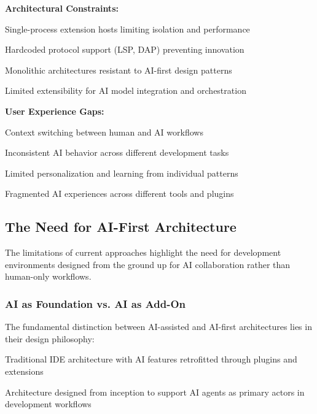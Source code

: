 \textbf{Architectural Constraints:}
\begin{compactlist}
    \item Single-process extension hosts limiting isolation and performance
    \item Hardcoded protocol support (LSP, DAP) preventing innovation
    \item Monolithic architectures resistant to AI-first design patterns
    \item Limited extensibility for AI model integration and orchestration
\end{compactlist}

\textbf{User Experience Gaps:}
\begin{compactlist}
    \item Context switching between human and AI workflows
    \item Inconsistent AI behavior across different development tasks
    \item Limited personalization and learning from individual patterns
    \item Fragmented AI experiences across different tools and plugins
\end{compactlist}

\subsection{The Need for AI-First Architecture}
\label{subsec:need-ai-first}

The limitations of current approaches highlight the need for development environments designed from the ground up for AI collaboration rather than human-only workflows.

\subsubsection{AI as Foundation vs. AI as Add-On}

The fundamental distinction between AI-assisted and AI-first architectures lies in their design philosophy:

\begin{description}[leftmargin=4cm,labelwidth=3.5cm]
    \item[\textbf{AI-Assisted}] Traditional IDE architecture with AI features retrofitted through plugins and extensions
    \item[\textbf{AI-First}] Architecture designed from inception to support AI agents as primary actors in development workflows
\end{description}

